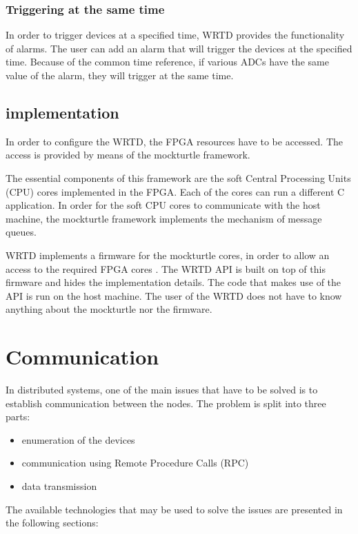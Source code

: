         \subsubsection{Triggering at the same time}
            In order to trigger devices at a specified time, WRTD provides the functionality of alarms. The user can add an alarm that will trigger the devices at the specified time. Because of the common time reference, if various ADCs have the same value of the alarm, they will trigger at the same time.
            
    \subsection{implementation}
        In order to configure the WRTD, the FPGA resources have to be accessed. The access is provided by means of the mockturtle framework. 
        
        The essential components of this framework are the soft Central Processing Units (CPU) cores implemented in the FPGA. Each of the cores can run a different C application. In order for the soft CPU cores to communicate with the host machine, the mockturtle framework implements the mechanism of message queues. 
        
        WRTD implements a firmware for the mockturtle cores, in order to allow an access to the required FPGA cores \cite{mockturtle_ohwr}. The WRTD API is built on top of this firmware and hides the implementation details. The code that makes use of the API is run on the host machine. The user of the WRTD does not have to know anything about the mockturtle nor the firmware.
        
\section{Communication}
    In distributed systems, one of the main issues that have to be solved is to establish communication between the nodes. The problem is split into three parts:
    \begin{itemize}
        \item enumeration of the devices
        \item communication using Remote Procedure Calls (RPC)
        \item data transmission
    \end{itemize}
    The available technologies that may be used to solve the issues are presented in the following sections:
    
